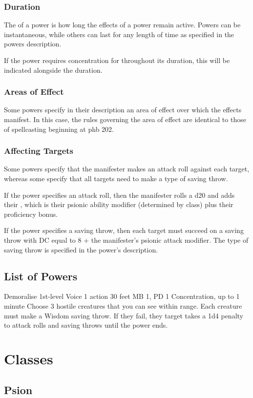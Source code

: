 \subsection{Duration}
The  of a power is how long the effects
of a power remain active.
Powers can be instantaneous,
while others can last for any length of time
as specified in the powers description.

If the power requires concentration for throughout its duration,
this will be indicated alongside the duration.

\subsection{Areas of Effect}
Some powers specify in their description an area of effect
over which the effects manifest.
In this case, the rules governing the area of effect
are identical to those of spellcasting beginning at
phb 202.

\subsection{Affecting Targets}
Some powers specify that the manifester makes an attack
roll against each target,
whereas some specify that all targets need to make
a type of saving throw.

If the power specifies an attack roll,
then the manifester rolls a d20
and adds their ,
which is their psionic ability modifier (determined by class)
plus their proficiency bonus.

If the power specifies a saving throw,
then each target must succeed on a saving throw
with DC equal to 8 + the manifester's psionic attack modifier.
The type of saving throw
is specified in the power's description.

\section{List of Powers}
\label{sec:list_of_powers}
\DndPowerHeader%
  {Demoralise}
  {1st-level Voice}
  {1 action}
  {30 feet}
  {MB 1, PD 1}
  {Concentration, up to 1 minute}
Choose 3 hostile creatures that you can see within range.
Each creature must make a Wisdom saving throw.
If they fail, they target takes a 1d4 penalty to attack rolls and
saving throws until the power ends.

\chapter{Classes}

\section{Psion}


